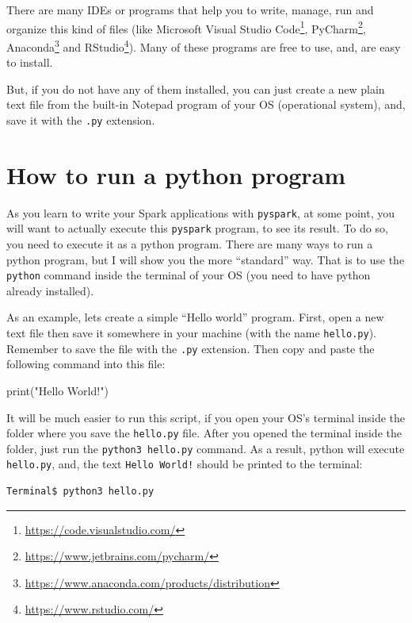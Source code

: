 \documentclass[
  11pt,
  letterpaper,
  DIV=11,
  numbers=noendperiod]{scrreprt}
\newenvironment{Shaded}{\begin{snugshade}}{\end{snugshade}}
\newcommand{\BuiltInTok}[1]{\textcolor[rgb]{0.00,0.23,0.31}{#1}}
\newcommand{\NormalTok}[1]{\textcolor[rgb]{0.00,0.23,0.31}{#1}}
\newcommand{\StringTok}[1]{\textcolor[rgb]{0.13,0.47,0.30}{#1}}
\begin{document}
There are many IDEs or programs that help you to write, manage, run and
organize this kind of files (like Microsoft Visual Studio
Code\footnote{\url{https://code.visualstudio.com/}}, PyCharm\footnote{\url{https://www.jetbrains.com/pycharm/}},
Anaconda\footnote{\url{https://www.anaconda.com/products/distribution}}
and RStudio\footnote{\url{https://www.rstudio.com/}}). Many of these
programs are free to use, and, are easy to install.

But, if you do not have any of them installed, you can just create a new
plain text file from the built-in Notepad program of your OS
(operational system), and, save it with the \texttt{.py} extension.

\section{How to run a python program}\label{how-to-run-a-python-program}

As you learn to write your Spark applications with \texttt{pyspark}, at
some point, you will want to actually execute this \texttt{pyspark}
program, to see its result. To do so, you need to execute it as a python
program. There are many ways to run a python program, but I will show
you the more ``standard'' way. That is to use the \texttt{python}
command inside the terminal of your OS (you need to have python already
installed).

As an example, lets create a simple ``Hello world'' program. First, open
a new text file then save it somewhere in your machine (with the name
\texttt{hello.py}). Remember to save the file with the \texttt{.py}
extension. Then copy and paste the following command into this file:

\begin{Shaded}
\begin{Highlighting}[]
\BuiltInTok{print}\NormalTok{(}\StringTok{"Hello World!"}\NormalTok{)}
\end{Highlighting}
\end{Shaded}

It will be much easier to run this script, if you open your OS's
terminal inside the folder where you save the \texttt{hello.py} file.
After you opened the terminal inside the folder, just run the
\texttt{python3\ hello.py} command. As a result, python will execute
\texttt{hello.py}, and, the text \texttt{Hello\ World!} should be
printed to the terminal:

\begin{verbatim}
Terminal$ python3 hello.py
\end{verbatim}
\end{document}
